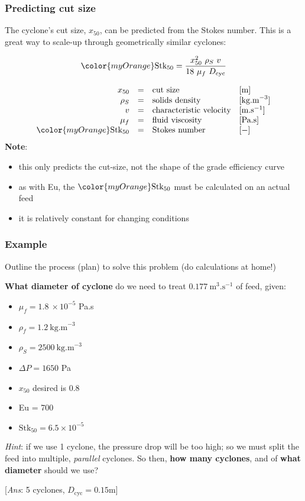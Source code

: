 \begin{frame}\frametitle{Predicting cut size}
	The cyclone's cut size, $x_{50}$, can be predicted from the Stokes number. This is a great way to scale-up through geometrically similar cyclones:
	\begin{exampleblock}{}
		\[{\color{myOrange}\text{Stk}_{50}} = \dfrac{x_{50}^2 \,\,\rho_S \,\,v}{18\,\, \mu_f \,\,D_\text{cyc}}\]
	\end{exampleblock}
	\[
		\begin{array}{rcll}
			x_{50}		&=& \text{cut size} 				&[\text{m}]\\
			\rho_S		&=& \text{solids density} 			&[\text{kg.m}^{-3}]\\
			v 			&=& \text{characteristic velocity} 	&[\text{m.s}^{-1}]\\
			\mu_f	    &=& \text{fluid viscosity}        	&[\text{Pa.s}]\\
			{\color{myOrange}\text{Stk}_{50}} &=& \text{Stokes number}  & [-]
		\end{array}
	\]
	\textbf{Note}: 
	\begin{itemize}
		\item	this only predicts the cut-size, not the shape of the grade efficiency curve
		\item	as with Eu, the ${\color{myOrange}\text{Stk}_{50}}$ must be calculated on an actual feed
		\item	it is relatively constant for changing conditions
	\end{itemize}
\end{frame}

\begin{frame}\frametitle{Example}
	
	Outline the process (plan) to solve this problem (do calculations at home!)
	
	\vspace{12pt}
	\textbf{What diameter of cyclone} do we need to treat $0.177~\text{m}^3\text{.s}^{-1}$ of feed, given:
	\begin{itemize}
		\item	$\mu_f = 1.8~\times 10^{-5}$ Pa.s
		\item	$\rho_f = 1.2~\text{kg.m}^{-3}$
		\item	$\rho_S	= 2500~\text{kg.m}^{-3}$
		\item	$\Delta P = 1650$ Pa
		\item	$x_{50}$ desired is 0.8 \micron
		\item	Eu = 700
		\item	$\text{Stk}_{50} = 6.5 \times 10^{-5}$
	\end{itemize}
	\emph{Hint}: if we use 1 cyclone, the pressure drop will be too high; so we must split the feed into multiple, \emph{parallel} cyclones. So then,
	\textbf{how many cyclones}, and of \textbf{what diameter} should we use?
	
	\vspace{8pt}
	{\scriptsize {\color{myOrange}[\emph{Ans}: 5 cyclones, $D_\text{cyc}=0.15$m]}}
\end{frame}

